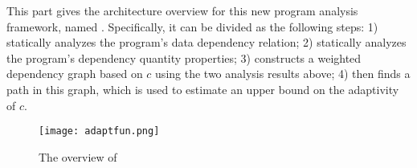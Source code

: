 This part gives the architecture overview for this 
new program analysis framework, named {\THESYSTEM}.
Specifically, it can be divided as the following steps:
1) statically analyzes the program's data dependency relation;
2) statically analyzes the program's dependency quantity properties;
3) constructs a weighted dependency graph based on $c$ using the two analysis results above; 
4) then finds a path in this graph, which is used to estimate an upper bound on the adaptivity of $c$.
\begin{figure}
  \centering    
\texttt{[image: adaptfun.png]}
  \vspace{-0.3cm}
  \caption{The overview of {\THESYSTEM}}
  \label{fig:adaptfun}
  \vspace{-0.5cm}
\end{figure}

